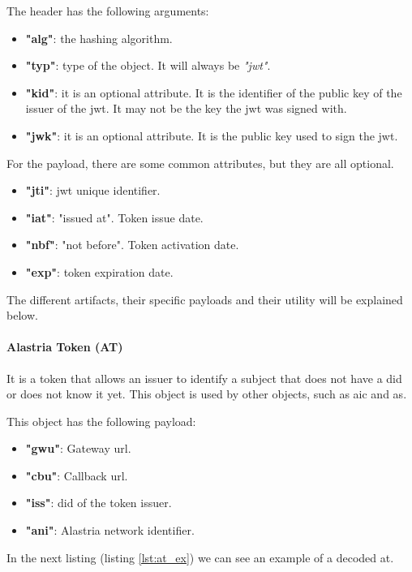 The header has the following arguments:
\begin{itemize}
    \item \textbf{"alg"}: the hashing algorithm.
    \item \textbf{"typ"}: type of the object. It will always be \textit{"\acrshort{jwt}"}.
    \item \textbf{"kid"}: it is an optional attribute. It is the identifier of the public key of the issuer of the \acrshort{jwt}. It may not be the key the \acrshort{jwt} was signed with.
    \item \textbf{"jwk"}: it is an optional attribute. It is the public key used to sign the \acrshort{jwt}.
\end{itemize}
For the payload, there are some common attributes, but they are all optional.
\begin{itemize}
    \item \textbf{"jti"}: \acrshort{jwt} unique identifier.
    \item \textbf{"iat"}: "issued at". Token issue date.
    \item \textbf{"nbf"}: "not before". Token activation date.
    \item \textbf{"exp"}: token expiration date.
\end{itemize}
The different artifacts, their specific payloads and their utility will be explained below.

\paragraph{Alastria Token (AT)}
It is a token that allows an issuer to identify a subject that does not have a \acrshort{did} or does not know it yet. This object is used by other objects, such as \acrfull{aic} and \acrfull{as}.

This object has the following payload:
\begin{itemize}
    \item \textbf{"gwu"}: Gateway \acrshort{url}.
    \item \textbf{"cbu"}: Callback \acrshort{url}.
    \item \textbf{"iss"}: \acrshort{did} of the token issuer.
    \item \textbf{"ani"}: Alastria network identifier.
\end{itemize}
In the next listing (listing \ref{lst:at_ex}) we can see an example of a decoded \acrlong{at}.


